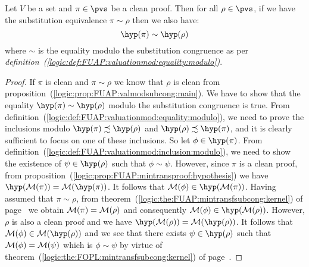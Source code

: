 \begin{prop}\label{logic:prop:FUAP:valmodsubcong:hypothesis}
Let $V$ be a set and $\pi\in\pvs$ be a clean proof. Then for all
$\rho\in\pvs$, if we have the substitution equivalence $\pi\sim\rho$
then we also have:
    \[
    \hyp(\pi)\sim\hyp(\rho)
    \]
where $\sim$ is the equality modulo the substitution congruence as
per {\em
definition~(\ref{logic:def:FUAP:valuationmod:equality:modulo})}.
\end{prop}
\begin{proof}
If $\pi$ is clean and $\pi\sim\rho$ we know that $\rho$ is clean
from proposition~(\ref{logic:prop:FUAP:valmodsubcong:main}). We have
to show that the equality $\hyp(\pi)\sim\hyp(\rho)$ modulo the
substitution congruence is true. From
definition~(\ref{logic:def:FUAP:valuationmod:equality:modulo}), we
need to prove the inclusions modulo $\hyp(\pi)\precsim\hyp(\rho)$
and $\hyp(\rho)\precsim\hyp(\pi)$, and it is clearly sufficient to
focus on one of these inclusions. So let $\phi\in\hyp(\pi)$. From
definition~(\ref{logic:def:FUAP:valuationmod:inclusion:modulo}), we
need to show the existence of $\psi\in\hyp(\rho)$ such that
$\phi\sim\psi$. However, since $\pi$ is a clean proof, from
proposition~(\ref{logic:prop:FUAP:mintransproof:hypothesis}) we have
$\hyp({\cal M}(\pi))={\cal M}(\hyp(\pi))$. It follows that ${\cal
M}(\phi)\in\hyp({\cal M}(\pi))$. Having assumed that $\pi\sim\rho$,
from theorem~(\ref{logic:the:FUAP:mintransfsubcong:kernel}) of
page~\pageref{logic:the:FUAP:mintransfsubcong:kernel} we obtain
${\cal M}(\pi)={\cal M}(\rho)$ and consequently ${\cal
M}(\phi)\in\hyp({\cal M}(\rho))$. However, $\rho$ is also a clean
proof and we have $\hyp({\cal M}(\rho))={\cal M}(\hyp(\rho))$. It
follows that ${\cal M}(\phi)\in{\cal M}(\hyp(\rho))$ and we see that
there exists $\psi\in\hyp(\rho)$ such that ${\cal M}(\phi)={\cal
M}(\psi)$ which is $\phi\sim\psi$ by virtue of
theorem~(\ref{logic:the:FOPL:mintransfsubcong:kernel}) of
page~\pageref{logic:the:FOPL:mintransfsubcong:kernel}.
\end{proof}
